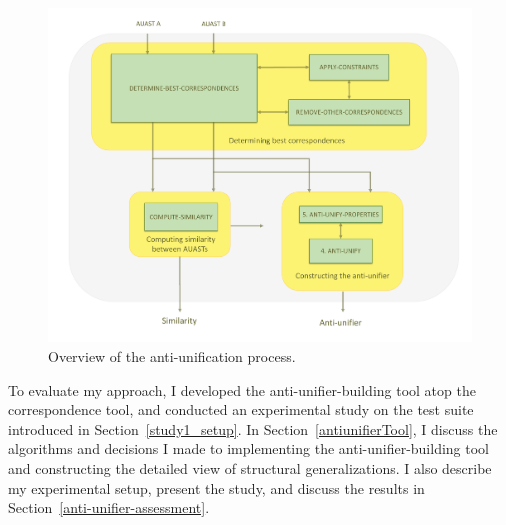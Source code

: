 


\begin{figure} [H]
  \centering\includegraphics [width = \textwidth]{Drawing4/auOverview.pdf}
  \caption{Overview of the anti-unification process.}
  \label{fig:meth_overview}
\end{figure}


To evaluate my approach, I developed the anti-unifier-building tool atop the correspondence tool, and conducted an experimental study on the test suite introduced in Section~\ref{study1_setup}. In Section~\ref{antiunifierTool}, I discuss the algorithms and decisions I made to implementing the anti-unifier-building tool and constructing the detailed view of structural generalizations. I also describe my experimental setup, present the study, and discuss the results in Section~\ref{anti-unifier-assessment}.




